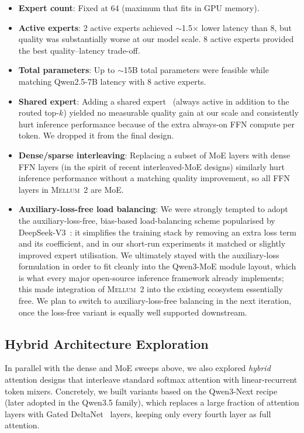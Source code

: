 \documentclass{llmxive}
\providecommand{\modelname}{\textsc{Mellum~2}\xspace}
\begin{document}
\begin{itemize}
  \item \textbf{Expert count}: Fixed at 64 (maximum that fits in GPU memory).
  \item \textbf{Active experts}: 2 active experts achieved ${\sim}$1.5$\times$
    lower latency than 8, but quality was substantially worse at our model
    scale. 8 active experts provided the best quality--latency trade-off.
  \item \textbf{Total parameters}: Up to ${\sim}$15B total parameters were
    feasible while matching Qwen2.5-7B latency with 8 active experts.
  \item \textbf{Shared expert}: Adding a shared expert~\cite{dai2024deepseekmoe} (always active in
    addition to the routed top-$k$) yielded no measurable quality gain at our
    scale and consistently hurt inference performance because of the extra
    always-on FFN compute per token. We dropped it from the final design.
  \item \textbf{Dense/sparse interleaving}: Replacing a subset of MoE layers
    with dense FFN layers (in the spirit of recent
    interleaved-MoE designs) similarly hurt inference performance without a
    matching quality improvement, so all FFN layers in \modelname{} are MoE.
  \item \textbf{Auxiliary-loss-free load balancing}: We were strongly tempted
    to adopt the auxiliary-loss-free, bias-based load-balancing scheme
    popularised by DeepSeek-V3~\cite{deepseekai2025deepseekv3}: it simplifies
    the training stack by removing an extra loss term and its coefficient,
    and in our short-run experiments it matched or slightly improved expert
    utilisation. We ultimately stayed with the auxiliary-loss formulation in
    order to fit cleanly into the Qwen3-MoE module layout, which is what
    every major open-source inference framework already implements; this made
    integration of \modelname{} into the existing ecosystem essentially
    free. We plan to switch to auxiliary-loss-free balancing in the next
    iteration, once the loss-free variant is equally well supported
    downstream.
\end{itemize}

\subsection{Hybrid Architecture Exploration}
\label{app:hybrid-arch}

In parallel with the dense and MoE sweeps above, we also explored
\emph{hybrid} attention designs that interleave standard softmax attention
with linear-recurrent token mixers. Concretely, we built variants based on
the Qwen3-Next recipe~\cite{qwen2026qwen35} (later adopted in the Qwen3.5
family), which replaces a large fraction of attention layers with Gated
DeltaNet~\cite{yang2025gateddeltanet} layers, keeping only every fourth
layer as full attention.
\end{document}
